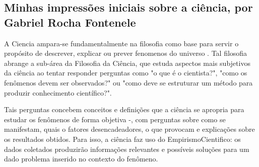 \subsection{Minhas impressões iniciais sobre a ciência, por Gabriel Rocha Fontenele}

A \gls{Ciencia} ampara-se fundamentalmente na filosofia como base para servir o propósito de descrever, explicar ou prever \gls{fenomeno}s do universo \citep{floridi_blackwell_2004}. Tal filosofia abrange a sub-área da Filosofia da Ciência, que estuda aspectos mais subjetivos da ciência ao tentar responder perguntas como "o que é o cientista?", "como os fenômenos devem ser observados?" ou "como deve se estruturar um método para produzir conhecimento científico?".

Tais perguntas concebem conceitos e definições que a ciência se apropria para estudar os fenômenos de forma objetiva -, com perguntas sobre como se manifestam, quais o fatores desencadeadores, o que provocam e explicações sobre os resultados obtidos. Para isso, a ciência faz uso do \gls{EmpirismoCientifico}: os dados coletados produzirão informações relevantes e possíveis soluções para um dado problema inserido no contexto do fenômeno.